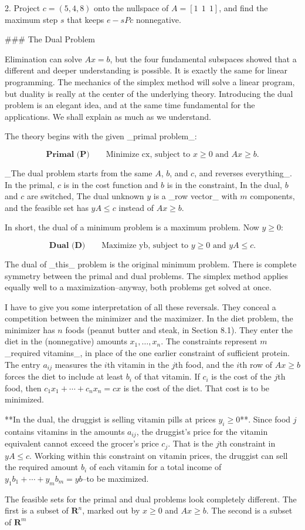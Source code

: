 2. Project \(c=(5,4,8)\) onto the nullspace of \(A=[1\ \ 1\ \ 1]\), and find the maximum step \(s\) that keeps \(e-sPc\) nonnegative.

### The Dual Problem

Elimination can solve \(Ax=b\), but the four fundamental subspaces showed that a different and deeper understanding is possible. It is exactly the same for linear programming. The mechanics of the simplex method will solve a linear program, but duality is really at the center of the underlying theory. Introducing the dual problem is an elegant idea, and at the same time fundamental for the applications. We shall explain as much as we understand.

The theory begins with the given _primal problem_:

\[\textbf{Primal (P)}\qquad\text{{Minimize }cx, subject to }x\geq 0\text{ and }Ax\geq b.\]

_The dual problem starts from the same \(A\), \(b\), and \(c\), and reverses everything_. In the primal, \(c\) is in the cost function and \(b\) is in the constraint, In the dual, \(b\) and \(c\) are switched, The dual unknown \(y\) is a _row vector_ with \(m\) components, and the feasible set has \(yA\leq c\) instead of \(Ax\geq b\).

In short, the dual of a minimum problem is a maximum problem. Now \(y\geq 0\):

\[\textbf{Dual (D)}\qquad\text{{Maximize }yb, subject to }y\geq 0\text{ and }yA\leq c.\]

The dual of _this_ problem is the original minimum problem. There is complete symmetry between the primal and dual problems. The simplex method applies equally well to a maximization--anyway, both problems get solved at once.

I have to give you some interpretation of all these reversals. They conceal a competition between the minimizer and the maximizer. In the diet problem, the minimizer has \(n\) foods (peanut butter and steak, in Section 8.1). They enter the diet in the (nonnegative) amounts \(x_{1},\ldots,x_{n}\). The constraints represent \(m\)_required vitamins_, in place of the one earlier constraint of sufficient protein. The entry \(a_{ij}\) measures the \(i\)th vitamin in the \(j\)th food, and the \(i\)th row of \(Ax\geq b\) forces the diet to include at least \(b_{i}\) of that vitamin. If \(c_{i}\) is the cost of the \(j\)th food, then \(c_{1}x_{1}+\cdots+c_{n}x_{n}=cx\) is the cost of the diet. That cost is to be minimized.

**In the dual, the druggist is selling vitamin pills at prices \(y_{i}\geq 0\)**. Since food \(j\) contains vitamins in the amounts \(a_{ij}\), the druggist's price for the vitamin equivalent cannot exceed the grocer's price \(c_{j}\). That is the \(j\)th constraint in \(yA\leq c\). Working within this constraint on vitamin prices, the druggist can sell the required amount \(b_{i}\) of each vitamin for a total income of \(y_{1}b_{1}+\cdots+y_{m}b_{m}=yb\)--to be maximized.

The feasible sets for the primal and dual problems look completely different. The first is a subset of \(\textbf{R}^{n}\), marked out by \(x\geq 0\) and \(Ax\geq b\). The second is a subset of \(\textbf{R}^{m}\) 